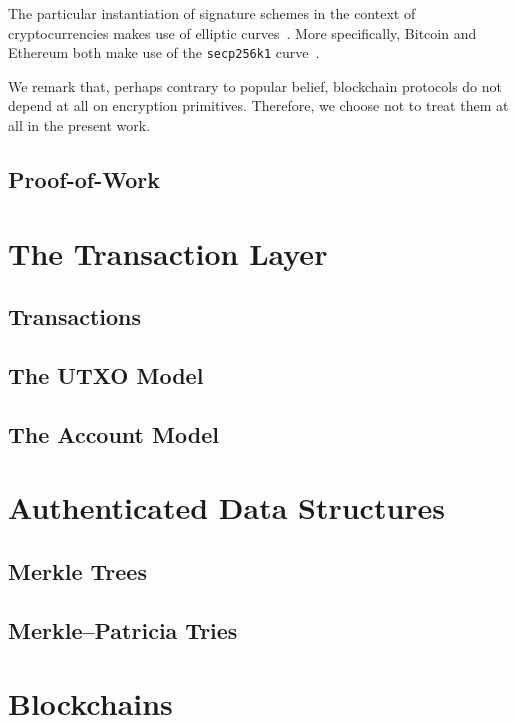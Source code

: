 The particular instantiation of signature schemes in the context of
cryptocurrencies makes use of elliptic curves~\cite{ec}. More specifically, Bitcoin
and Ethereum both make use of the \texttt{secp256k1} curve~\cite{secp256k1}.

\begin{remark}
We remark that, perhaps contrary to popular belief, blockchain protocols
do not depend at all on encryption primitives. Therefore, we choose not to
treat them at all in the present work.
\end{remark}

\subsection{Proof-of-Work}


\section{The Transaction Layer}
\subsection{Transactions}
\subsection{The UTXO Model}
\subsection{The Account Model}

\section{Authenticated Data Structures}
\subsection{Merkle Trees}
\subsection{Merkle–Patricia Tries}

\section{Blockchains}
